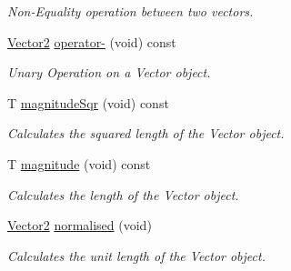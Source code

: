 \begin{DoxyCompactItemize}
\begin{DoxyCompactList}\small\item\em Non-\/\+Equality operation between two vectors. \end{DoxyCompactList}\item 
\hyperlink{classsparky_1_1_vector2}{Vector2} \hyperlink{classsparky_1_1_vector2_a6a40c2389b0f97186b41b0c559a6c800}{operator-\/} (void) const 
\begin{DoxyCompactList}\small\item\em Unary Operation on a Vector object. \end{DoxyCompactList}\item 
T \hyperlink{classsparky_1_1_vector2_a41ca66495f18b3a033fa679878ebd89e}{magnitude\+Sqr} (void) const 
\begin{DoxyCompactList}\small\item\em Calculates the squared length of the Vector object. \end{DoxyCompactList}\item 
T \hyperlink{classsparky_1_1_vector2_a04e90257c8bced3f650094807c82f6e8}{magnitude} (void) const 
\begin{DoxyCompactList}\small\item\em Calculates the length of the Vector object. \end{DoxyCompactList}\item 
\hyperlink{classsparky_1_1_vector2}{Vector2} \hyperlink{classsparky_1_1_vector2_a683c081fc98603639cb7129e5b97ec36}{normalised} (void)
\begin{DoxyCompactList}\small\item\em Calculates the unit length of the Vector object. \end{DoxyCompactList}\end{DoxyCompactItemize}
